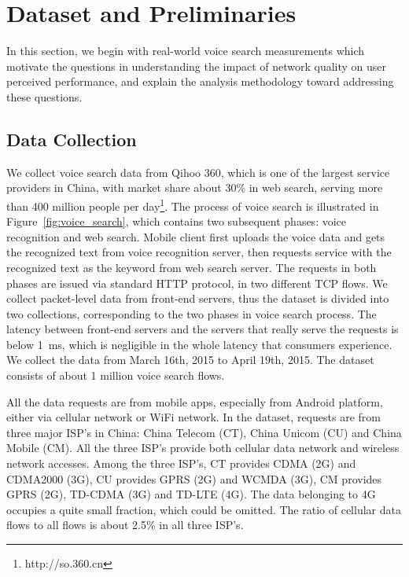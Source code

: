 
\section{Dataset and Preliminaries}
\label{sec:dataset}

In this section, we begin with real-world voice search measurements which motivate the questions in understanding the impact of network quality on user perceived performance, and explain the analysis methodology toward addressing these questions.

\subsection{Data Collection}

We collect voice search data from Qihoo 360, which is one of the largest service providers in China, with market share about 30\% in web search, serving more than 400 million people per day\footnote{http://so.360.cn}. The process of voice search is illustrated in Figure~\ref{fig:voice_search}, which contains two subsequent phases: voice recognition and web search. Mobile client first uploads the voice data and gets the recognized text from voice recognition server, then requests service with the recognized text as the keyword from web search server. The requests in both phases are issued via standard HTTP protocol, in two different TCP flows. We collect packet-level data from front-end servers, thus the dataset is divided into two collections, corresponding to the two phases in voice search process. The latency between front-end servers and the servers that really serve the requests is below 1~ms, which is negligible in the whole latency that consumers experience. We collect the data from March 16th, 2015 to April 19th, 2015. The dataset consists of about 1 million voice search flows.

All the data requests are from mobile apps, especially from Android platform, either via cellular network or WiFi network. In the dataset, requests are from three major ISP's in China: China Telecom (CT), China Unicom (CU) and China Mobile (CM). All the three ISP's provide both cellular data network and wireless network accesses. Among the three ISP's, CT provides CDMA (2G) and CDMA2000 (3G), CU provides GPRS (2G) and WCMDA (3G), CM provides GPRS (2G), TD-CDMA (3G) and TD-LTE (4G). The data belonging to 4G occupies a quite small fraction, which could be omitted. The ratio of cellular data flows to all flows is about 2.5\% in all three ISP's.

